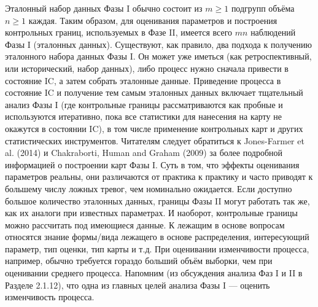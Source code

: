Эталонный набор данных Фазы I обычно состоит из \(m \ge 1\) подгрупп объёма \(n \ge 1\) каждая. Таким образом, для оценивания параметров и построения контрольных границ, используемых в Фазе II, имеется всего \(mn\) наблюдений Фазы I (эталонных данных). Существуют, как правило, два подхода к получению эталонного набора данных Фазы I. Он может уже иметься (как ретроспективный, или исторический, набор данных), либо процесс нужно сначала привести в состояние IC, а затем собрать эталонные данные. Приведение процесса в состояние IC и получение тем самым эталонных данных включает тщательный анализ Фазы I (где контрольные границы рассматриваются как пробные и используются итеративно, пока все статистики для нанесения на карту не окажутся в состоянии IC), в том числе применение контрольных карт и других статистических инструментов. Читателям следует обратиться к Jones-Farmer et al. (2014) и Chakraborti, Human and Graham (2009) за более подробной информацией о построении карт Фазы I. Суть в том, что эффекты оценивания параметров реальны, они различаются от практика к практику и часто приводят к большему числу ложных тревог, чем номинально ожидается. Если доступно большое количество эталонных данных, границы Фазы II могут работать так же, как их аналоги при известных параметрах. И наоборот, контрольные границы можно рассчитать под имеющиеся данные. К лежащим в основе вопросам относятся знание формы/вида лежащего в основе распределения, интересующий параметр,
тип оценки, тип карты и т.д. При оценивании изменчивости процесса, например, обычно требуется гораздо больший объём выборки, чем при оценивании среднего процесса. Напомним (из обсуждения анализа Фаз I и II в Разделе 2.1.12), что одна из главных целей анализа Фазы I — оценить изменчивость процесса.

